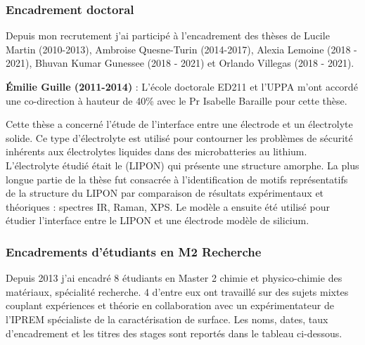 \documentclass[11pt]{artuppax}
\newcounter{subsec}[section]
\begin{document}
\subsubsection{Encadrement doctoral}

Depuis mon recrutement j'ai participé à l'encadrement des thèses de
Lucile Martin (2010-2013), Ambroise Quesne-Turin (2014-2017),
Alexia Lemoine (2018 - 2021), Bhuvan Kumar Gunessee (2018 - 2021)
et Orlando Villegas (2018 - 2021).

\textbf{Émilie Guille (2011-2014)} :
L'école doctorale ED211 et l'UPPA m'ont accordé une co-direction
à hauteur de 40\% avec le Pr Isabelle Baraille pour cette thèse.

Cette thèse a concerné l'étude de l'interface entre une électrode et un électrolyte
solide. Ce type d'électrolyte est utilisé pour contourner les problèmes de sécurité
inhérents aux électrolytes liquides dans des microbatteries au lithium. L'électrolyte
étudié était le  (LIPON) qui présente une structure amorphe. La plus
longue partie de la thèse fut consacrée à l'identification de motifs représentatifs de
la structure du LIPON par comparaison de résultats expérimentaux et théoriques :
spectres IR, Raman, XPS. Le modèle a ensuite été utilisé pour étudier l'interface
entre le LIPON et une électrode modèle de silicium.

\subsubsection{Encadrements d'étudiants en M2 Recherche}

Depuis 2013 j'ai encadré 8 étudiants en Master 2 chimie et physico-chimie des matériaux,
spécialité recherche. 4 d'entre eux ont travaillé sur des sujets mixtes couplant expériences
et théorie en collaboration avec un expérimentateur de l'IPREM spécialiste de la caractérisation de
surface. Les noms, dates, taux d'encadrement et les titres des stages sont reportés
dans le tableau ci-dessous.
\end{document}
